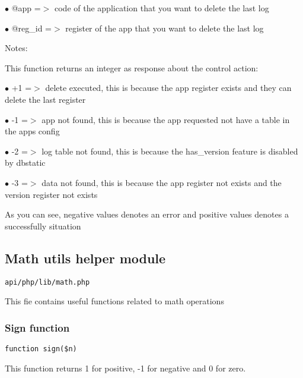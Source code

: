 \documentclass[a4paper]{article}
\begin{document}
\begin{compactitem}
\item[\color{myblue}$\bullet$] @app    =$>$ code of the application that you want to delete the last log
\item[\color{myblue}$\bullet$] @reg\_id =$>$ register of the app that you want to delete the last log
\end{compactitem}

Notes:

This function returns an integer as response about the control action:

\begin{compactitem}
\item[\color{myblue}$\bullet$] +1 =$>$ delete executed, this is because the app register exists and they can delete the last register
\item[\color{myblue}$\bullet$] -1 =$>$ app not found, this is because the app requested not have a table in the apps config
\item[\color{myblue}$\bullet$] -2 =$>$ log table not found, this is because the has\_version feature is disabled by dbstatic
\item[\color{myblue}$\bullet$] -3 =$>$ data not found, this is because the app register not exists and the version register not exists
\end{compactitem}

As you can see, negative values denotes an error and positive values denotes a successfully situation

\hypertarget{toc493}{}
\subsection{Math utils helper module}

\begin{lstlisting}
api/php/lib/math.php
\end{lstlisting}

This fie contains useful functions related to math operations

\hypertarget{toc494}{}
\subsubsection{Sign function}

\begin{lstlisting}
function sign($n)
\end{lstlisting}

This function returns 1 for positive, -1 for negative and 0 for zero.
\end{document}
